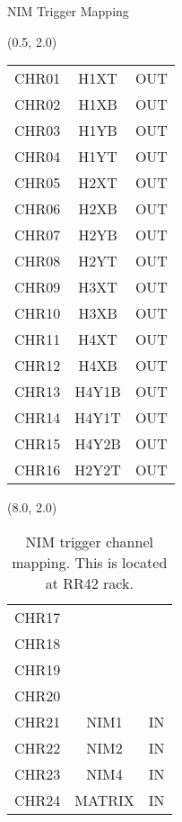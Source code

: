 \documentclass[10pt, xcolor={dvipsnames}, aspectratio = 169, sans,mathserif]{beamer}
\begin{document}
\begin{frame}{NIM Trigger Mapping}

\begin{textblock}{7.0}(0.5, 2.0)
\begin{table}
\begin{center}
\begin{tabular}{|c|c|c|}
\hline
\rowcolor{red!20}
CHR01 & H1XT & OUT \\
\rowcolor{red!20}
CHR02 & H1XB & OUT \\
\rowcolor{red!20}
CHR03 & H1YB & OUT \\
\rowcolor{red!20}
CHR04 & H1YT & OUT \\
\rowcolor{red!20}
CHR05 & H2XT & OUT \\
\rowcolor{red!20}
CHR06 & H2XB & OUT \\
\rowcolor{red!20}
CHR07 & H2YB & OUT \\
\rowcolor{red!20}
CHR08 & H2YT & OUT \\
\rowcolor{red!20}
CHR09 & H3XT & OUT \\
\rowcolor{red!20}
CHR10 & H3XB & OUT \\
\rowcolor{red!20}
CHR11 & H4XT & OUT \\
\rowcolor{red!20}
CHR12 & H4XB & OUT \\
\rowcolor{red!20}
CHR13 & H4Y1B & OUT \\
\rowcolor{red!20}
CHR14 & H4Y1T & OUT \\
\rowcolor{red!20}
CHR15 & H4Y2B & OUT \\
\rowcolor{red!20}
CHR16 & H2Y2T & OUT \\
\hline
\end{tabular}
\end{center}
\end{table}
\end{textblock}

\begin{textblock}{7.0}(8.0, 2.0)
\begin{table}
\begin{center}
\begin{tabular}{|c|c|c|}
\hline
CHR17 &       &     \\
CHR18 &       &     \\
CHR19 &       &     \\
CHR20 &       &     \\
\rowcolor{lime!20}
CHR21 & NIM1 & IN \\
\rowcolor{lime!20}
CHR22 & NIM2 & IN \\
\rowcolor{lime!20}
CHR23 & NIM4 & IN \\
\rowcolor{lime!20}
CHR24 & MATRIX & IN \\
\hline
\end{tabular}
\caption{NIM trigger channel mapping. This is located at RR42 rack.}
\end{center}
\end{table}
\end{textblock}

\end{frame}
\end{document}
